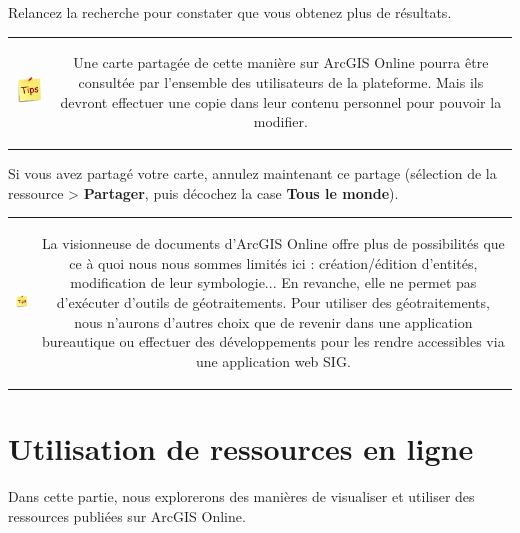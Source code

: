 \documentclass[11pt]{article}
\newcommand{\action}{$\Rightarrow$ }
\newcommand{\reponse}{
	\begin{tabbing}
	\hspace{2cm}\=\kill
	Réponse \> ............................................................................................ \\
 	\> ............................................................................................
	\end{tabbing}
}
\newenvironment{note}{%
	\begin{tabular}[t t]{c c}
		\includegraphics{img/tips.png}
		 &
		\begin{minipage}[c]{0.9\linewidth}
			\begin{sffamily}
}{%
			\end{sffamily}
		\end{minipage}
	\end{tabular}
}
\begin{document}
Relancez la recherche pour constater que vous obtenez plus de résultats.

\begin{note}
Une carte partagée de cette manière sur ArcGIS Online pourra être consultée par l'ensemble des utilisateurs de la plateforme. Mais ils devront effectuer une copie dans leur contenu personnel pour pouvoir la modifier.
\end{note}

Si vous avez partagé votre carte, annulez maintenant ce partage (sélection de la ressource > \textbf{Partager}, puis décochez la case \textbf{Tous le monde}).

\begin{note}
La visionneuse de documents d'ArcGIS Online offre plus de possibilités que ce à quoi nous nous sommes limités ici : création/édition d'entités, modification de leur symbologie... En revanche, elle ne permet pas d'exécuter d'outils de géotraitements. Pour utiliser des géotraitements, nous n'aurons d'autres choix que de revenir dans une application bureautique ou effectuer des développements pour les rendre accessibles via une application web SIG.
\end{note}

%
%
%
%
%
%
%



\section{Utilisation de ressources en ligne}
Dans cette partie, nous explorerons des manières de visualiser et utiliser des ressources publiées sur ArcGIS Online.
\end{document}
